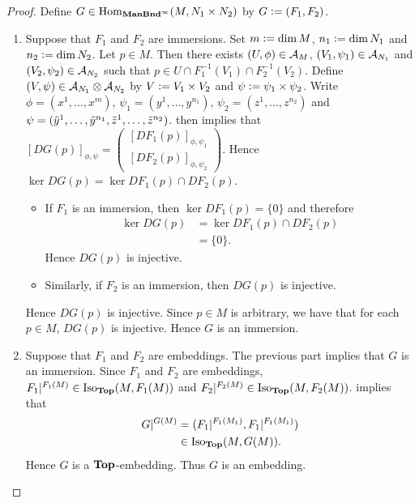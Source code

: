 \documentclass{book}
\begin{document}
\begin{proof}
	Define $G \in \operatorname{Hom}_{\operatorname*{\text{\textbf{ManBnd}}^{\infty}}}(M, N_1 \times N_2)$ by $G \vcentcolon= (F_1, F_2)$.
	\begin{enumerate}
		\item Suppose that $F_1$ and $F_2$ are immersions. Set $m \vcentcolon= \dim M$, $n_1 \vcentcolon= \dim N_1$ and $n_2 \vcentcolon= \dim N_2$. Let $p \in M$. Then there exists $(U, \phi) \in \mathcal{A}_M$, $(V_1, \psi_1) \in \mathcal{A}_{N_1}$ and $(V_2, \psi_2) \in \mathcal{A}_{N_2}$ such that $p \in U \cap F_1^{-1}(V_1) \cap F_2^{-1}(V_2)$. Define $(V, \psi) \in \mathcal{A}_{N_1} \otimes \mathcal{A}_{N_2}$ by $V \vcentcolon= V_1 \times V_2$ and $\psi \vcentcolon= \psi_1 \times \psi_2$. Write $\phi = (x^1, \ldots, x^m)$, $\psi_1 = (y^1, \ldots, y^{n_1})$, $\psi_2 = (z^1, \ldots, z^{n_2})$ and $\psi = (\tilde{y}^1, \ldots, \tilde{y}^{n_1}, \tilde{z}^1, \ldots, \tilde{z}^{n_2})$.  then implies that 
		$[DG(p)]_{\phi, \psi} = 
		\begin{pmatrix}
			[DF_1(p)]_{\phi, \psi_1} \\
			[DF_2(p)]_{\phi, \psi_2}
		\end{pmatrix}.$
		Hence $\ker DG(p) = \ker DF_1(p) \cap DF_2(p)$. 
		\begin{itemize}
			\item If $F_1$ is an immersion, then $\ker DF_1(p) = \{0\}$ and therefore
			\begin{align*}
				\ker DG(p) 
				& = \ker DF_1(p) \cap DF_2(p) \\
				& = \{0\}.
			\end{align*}
			Hence $DG(p)$ is injective. 
			\item Similarly, if $F_2$ is an immersion, then $DG(p)$ is injective.
		\end{itemize}
		Hence $DG(p)$ is injective. Since $p \in M$ is arbitrary, we have that for each $p \in M$, $DG(p)$ is injective. Hence $G$ is an immersion. 
		\item Suppose that $F_1$ and $F_2$ are embeddings. The previous part implies that $G$ is an immersion. Since $F_1$ and $F_2$ are embeddings, $F_1|^{F_1(M)} \in \operatorname{Iso}_{\operatorname*{\text{\textbf{Top}}}}(M, F_1(M))$ and $F_2|^{F_2(M)} \in \operatorname{Iso}_{\operatorname*{\text{\textbf{Top}}}}(M, F_2(M))$. \rex{}  implies that 
		\begin{align*}
			G|^{G(M)} 
			& = (F_1|^{F_1(M_1)}, F_1|^{F_1(M_1)}) \\
			& \in \operatorname{Iso}_{\operatorname*{\text{\textbf{Top}}}}( M, G(M)).
		\end{align*}
		Hence $G$ is a $\operatorname*{\text{\textbf{Top}}}$-embedding. Thus $G$ is an embedding.
	\end{enumerate}
\end{proof}
\end{document}
